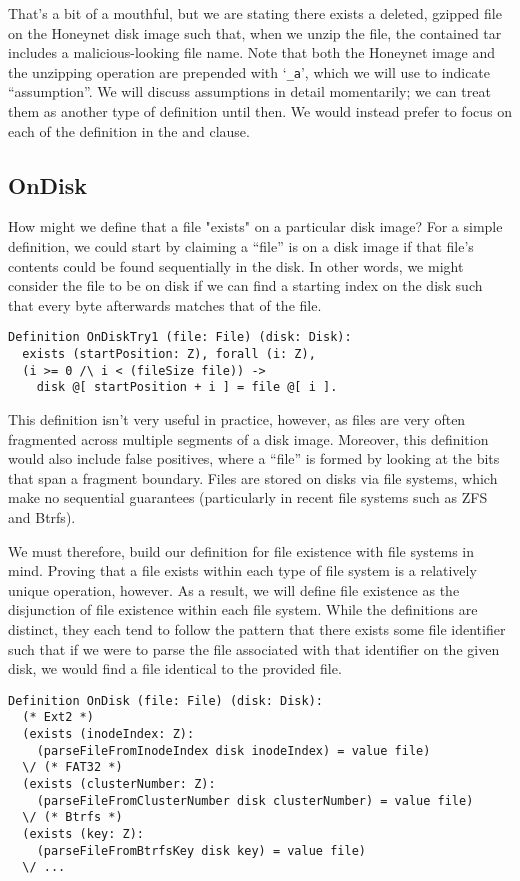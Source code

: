 \documentclass[nocopyrightspace]{sigplanconf}
\begin{document}
That's a bit of a mouthful, but we are stating there exists a deleted, gzipped
file on the Honeynet disk image such that, when we unzip the file, the
contained tar includes a malicious-looking file name. Note that both the
Honeynet image and the unzipping operation are prepended with `{\tt \_a}',
which we will use to indicate ``assumption''. We will discuss assumptions in
detail momentarily; we can treat them as another type of definition until
then. We would instead prefer to focus on each of the definition in the and
clause.

\subsection{OnDisk}

How might we define that a file "exists" on a particular disk image? For a
simple definition, we could start by claiming a ``file'' is on a disk image if
that file's contents could be found sequentially in the disk. In other words,
we might consider the file to be on disk if we can find a starting index on
the disk such that every byte afterwards matches that of the file.

\begin{lstlisting}
Definition OnDiskTry1 (file: File) (disk: Disk):
  exists (startPosition: Z), forall (i: Z),
  (i >= 0 /\ i < (fileSize file)) -> 
    disk @[ startPosition + i ] = file @[ i ].
\end{lstlisting}

This definition isn't very useful in practice, however, as files are very
often fragmented across multiple segments of a disk image. Moreover, this
definition would also include false positives, where a ``file'' is formed by
looking at the bits that span a fragment boundary. Files are stored on disks
via file systems, which make no sequential guarantees (particularly in recent
file systems such as ZFS and Btrfs).

We must therefore, build our definition for file existence with file systems
in mind. Proving that a file exists within each type of file system is a
relatively unique operation, however. As a result, we will define file
existence as the disjunction of file existence within each file system. While
the definitions are distinct, they each tend to follow the pattern that there
exists some file identifier such that if we were to parse the file associated
with that identifier on the given disk, we would find a file identical to the
provided file.

\begin{lstlisting}
Definition OnDisk (file: File) (disk: Disk):
  (* Ext2 *)
  (exists (inodeIndex: Z):
    (parseFileFromInodeIndex disk inodeIndex) = value file)
  \/ (* FAT32 *)
  (exists (clusterNumber: Z):
    (parseFileFromClusterNumber disk clusterNumber) = value file)
  \/ (* Btrfs *)
  (exists (key: Z):
    (parseFileFromBtrfsKey disk key) = value file)
  \/ ...
\end{lstlisting}
\end{document}
